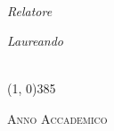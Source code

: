 \begin{titlepage}
    \vspace{1cm}
    
    
    \begin{LARGE}
        \begin{center}
            \textbf{\myTitle}\\
        \end{center}
    \end{LARGE}
    
    
    \vspace{1.5cm}
    
    \begin{large}
        \begin{flushleft}
            \textit{Relatore}\\ 
            \vspace{5pt} 
            \profTitle \myProf
        \end{flushleft}
        
        \begin{flushright}
            \textit{Laureando}\\ 
            \vspace{5pt} 
            \myName\\
            \matricola
        \end{flushright}
    \end{large}
    \vspace{1.3cm}
    
    \line(1, 0){385} \\
    \begin{normalsize}
        \textsc{Anno Accademico \myAA}
    \end{normalsize}
    
    \vfill 
    
\end{titlepage}